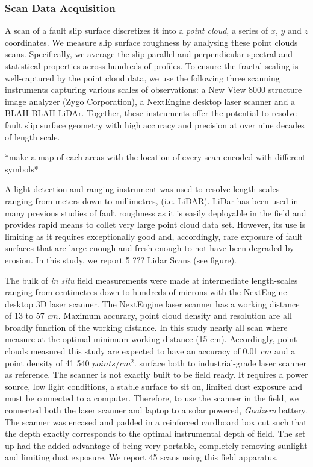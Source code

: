 \documentclass[12pt,a4paper]{article}
\begin{document}
	\subsubsection{Scan Data Acquisition}

A scan of a fault slip surface discretizes it into a \textit{point cloud}, a series of $x$, $y$ and $z$ coordinates. We measure slip surface roughness by analysing these point clouds scans. Specifically, we average the slip parallel and perpendicular spectral and statistical properties across hundreds of profiles. To ensure the fractal scaling is well-captured by the point cloud data, we use the following three scanning instruments capturing various scales of observations: a New View 8000 structure image analyzer (Zygo Corporation), a NextEngine desktop laser scanner and a BLAH BLAH LiDAr.  Together, these instruments offer the potential to resolve fault slip surface geometry with high accuracy and precision at over nine decades of length scale.

*make a map of each areas with the location of every scan encoded with different symbols*

A light detection and ranging instrument was used to resolve length-scales ranging from meters down to millimetres, (i.e. LiDAR). LiDar has been used in many previous studies of fault roughness as it is easily deployable in the field and provides rapid means to collet very large point cloud data set. However, its use is limiting as it requires exceptionally good and, accordingly, rare exposure of fault surfaces that are large enough and fresh enough to not have been degraded by erosion. In this study, we report 5 ??? Lidar Scans (see figure).

The bulk of \textit{in situ} field measurements were made at intermediate length-scales ranging from centimetres down to hundreds of microns with the NextEngine desktop 3D laser scanner. The NextEngine laser scanner has a working distance of 13 to 57 $cm$. Maximum accuracy, point cloud density and resolution are all broadly function of the working distance. In this study nearly all scan where measure at the optimal minimum working distance (15 cm). Accordingly, point clouds measured this study are expected to have an accuracy of 0.01 $cm$ and a point density of 41 540  $points/cm^2$. surface both to industrial-grade laser scanner as reference. The scanner is not exactly built to be field ready. It requires a power source, low light conditions, a stable surface to sit on, limited dust exposure and must be connected to a computer. Therefore, to use the scanner in the field, we connected both the laser scanner and laptop to a solar powered, \textit{Goalzero} battery. The scanner was encased and padded in a reinforced cardboard box cut such that the depth exactly corresponds to the optimal instrumental depth of field. The set up had the added advantage of being very portable, completely removing sunlight and limiting dust exposure. We report 45 scans using this field apparatus.
\end{document}
